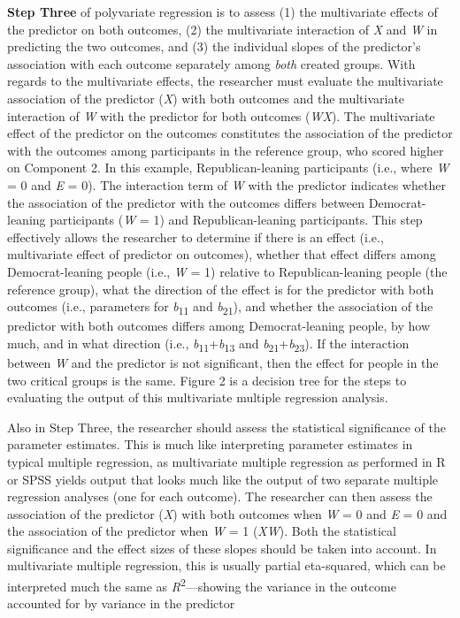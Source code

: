 \documentclass[authordate, meta]{jote-new-article}
\begin{document}
	\textbf{Step Three} of polyvariate regression is to assess (1) the multivariate effects of the predictor on both outcomes, (2) the multivariate interaction of \emph{X} and \emph{W} in predicting the two outcomes, and (3) the individual slopes of the predictor's association with each outcome separately among \emph{both} created groups. With regards to the multivariate effects, the researcher must evaluate the multivariate association of the predictor (\emph{X}) with both outcomes and the multivariate interaction of \emph{W} with the predictor for both outcomes (\emph{WX}). The multivariate effect of the predictor on the outcomes constitutes the association of the predictor with the outcomes among participants in the reference group, who scored higher on Component 2. In this example, Republican-leaning participants (i.e., where \emph{W} = 0 and \emph{E} = 0). The interaction term of \emph{W} with the predictor indicates whether the association of the predictor with the outcomes differs between Democrat-leaning participants (\emph{W} = 1) and Republican-leaning participants. This step effectively allows the researcher to determine if there is an effect (i.e., multivariate effect of predictor on outcomes), whether that effect differs among Democrat-leaning people (i.e., \emph{W} = 1) relative to Republican-leaning people (the reference group), what the direction of the effect is for the predictor with both outcomes (i.e., parameters for \emph{b}\textsubscript{11} and \emph{b}\textsubscript{21}), and whether the association of the predictor with both outcomes differs among Democrat-leaning people, by how much, and in what direction (i.e., \emph{b}\textsubscript{11}+\emph{b}\textsubscript{13} and \emph{b}\textsubscript{21}+\emph{b}\textsubscript{23}). If the interaction between \emph{W} and the predictor is not significant, then the effect for people in the two critical groups is the same. Figure 2 is a decision tree for the steps to evaluating the output of this multivariate multiple regression analysis.



	Also in Step Three, the researcher should assess the statistical significance of the parameter estimates. This is much like interpreting parameter estimates in typical multiple regression, as multivariate multiple regression as performed in R or SPSS yields output that looks much like the output of two separate multiple regression analyses (one for each outcome). The researcher can then assess the association of the predictor (\emph{X}) with both outcomes when \emph{W} = 0 and \emph{E} = 0 and the association of the predictor when \emph{W} = 1 (\emph{XW}). Both the statistical significance and the effect sizes of these slopes should be taken into account. In multivariate multiple regression, this is usually partial eta-squared, which can be interpreted much the same as \emph{R}\textsuperscript{2}—showing the variance in the outcome accounted for by variance in the predictor
\end{document}
